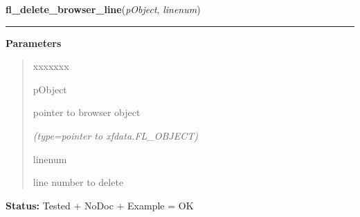     \label{xformslib:library:fl_delete_browser_line}

    \vspace{0.5ex}

\hspace{.8\funcindent}\begin{boxedminipage}{\funcwidth}

    \raggedright \textbf{fl\_delete\_browser\_line}(\textit{pObject}, \textit{linenum})

    \vspace{-1.5ex}

    \rule{\textwidth}{0.5\fboxrule}
\setlength{\parskip}{2ex}
\setlength{\parskip}{1ex}
      \textbf{Parameters}
      \vspace{-1ex}

      \begin{quote}
        \begin{Ventry}{xxxxxxx}

          \item[pObject]

          pointer to browser object

            {\it (type=pointer to xfdata.FL\_OBJECT)}

          \item[linenum]

          line number to delete

        \end{Ventry}

      \end{quote}

\textbf{Status:} Tested + NoDoc + Example = OK



    \end{boxedminipage}

    \label{xformslib:library:fl_replace_browser_line}

    \vspace{0.5ex}


